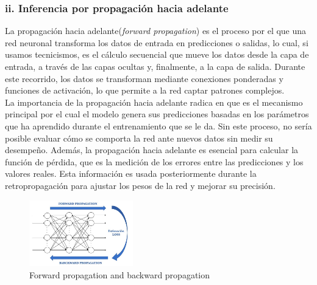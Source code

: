 \documentclass[11pt]{article} %
\begin{document}
\subsubsection*{ii. Inferencia por propagación hacia adelante}
La propagación hacia adelante(\textit{forward propagation}) es el proceso por el que una red neuronal transforma los datos de entrada en predicciones o salidas, lo cual, si usamos tecnicismos, es el cálculo secuencial que mueve los datos desde la capa de entrada, a través de las capas ocultas y, finalmente, a la capa de salida. Durante este recorrido, los datos se transforman mediante conexiones ponderadas y funciones de activación, lo que permite a la red captar patrones complejos. \\
La importancia de la propagación hacia adelante radica en que es el mecanismo principal por el cual el modelo genera sus predicciones basadas en los parámetros que ha aprendido durante el entrenamiento que se le da. Sin este proceso, no sería posible evaluar cómo se comporta la red ante nuevos datos sin medir su desempeño. Además, la propagación hacia adelante es esencial para calcular la función de pérdida, que es la medición de los errores entre las predicciones y los valores reales. Esta información es usada posteriormente durante la retropropagación  para ajustar los pesos de la red y mejorar su precisión.
\begin{figure}[H]
    \centering
    \includegraphics[width=0.4\textwidth]{Images/3eafe158-4126-48f0-ae70-65e707cc8988_668x427.jpg}
    \caption{Forward propagation and backward propagation}
    \label{fig:estructura-red-neurona-v2l}
\end{figure}
\end{document}
